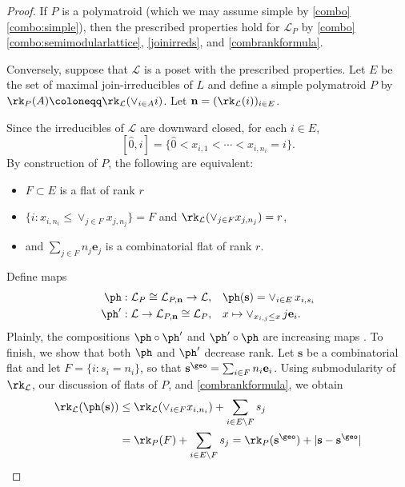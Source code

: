 \begin{proof}
  If $P$ is a polymatroid (which we may assume simple by \cref{combo}\cref{combo:simple}), then the prescribed properties hold for $\mathcal L_P$ by \cref{combo}\cref{combo:semimodularlattice}, \cref{joinirreds}, and \cref{combrankformula}.

  Conversely, suppose that $\mathcal L$ is a poset with the prescribed properties.
  Let $E$ be the set of maximal join-irreducibles of $L$ and define a simple polymatroid $P$ by $\rk_P(A) \coloneqq \rk_{\mathcal L}(\vee_{i \in A} i)$.
  Let $\mathbf n = (\rk_{\mathcal L}(i))_{i \in E}$.

  Since the irreducibles of $\mathcal L$ are downward closed, for each $i \in E$,
  \[
  [\hat 0, i]  = \{\hat 0 < x_{i,1} < \cdots < x_{i, n_i} = i\}.
  \]
  By construction of $P$, the following are equivalent:
  \begin{itemize}
  \item $F \subset E$ is a flat of rank $r$
  \item  $\{i : x_{i,n_i} \leq \vee_{j \in F} x_{j, n_j}\} = F$ and $\rk_{\mathcal L}(\vee_{j \in F}  x_{j, n_j}) = r$,
  \item and $\sum_{j \in F} n_j \mathbf e_j$ is a combinatorial flat of rank $r$.
  \end{itemize}
  Define maps
  \begin{align*}
    \ph: \mathcal L_P \cong \mathcal L_{P, \mathbf n} \to \mathcal L,& \quad \ph(\mathbf s) = \vee_{i \in E}\, x_{i, s_i} \\
    \ph': \mathcal L \to \mathcal L_{P, \mathbf n} \cong \mathcal L_P, &\quad x \mapsto \vee_{x_{i,j} \leq x}\, j \mathbf e_i.
  \end{align*}
  Plainly, the compositions $\ph \circ \ph'$ and $\ph' \circ \ph$ are increasing maps .
  To finish, we show that both $\ph$ and $\ph'$ decrease rank.
  Let $\mathbf s$ be a combinatorial flat and let $F = \{i : s_i = n_i\}$, so that $\mathbf s^\geo = \sum_{i \in F} n_i \mathbf e_i$.
  Using submodularity of $\rk_{\mathcal L}$, our discussion of flats of $P$, and \cref{combrankformula}, we obtain
  \begin{align*}
    \rk_{\mathcal L}(\ph(\mathbf s))
    &\leq \rk_{\mathcal L}(\vee_{i \in F} x_{i, n_i}) + \sum_{i \in E \setminus F} s_j\\ 
    &= \rk_P(F) + \sum_{i \in E \setminus F} s_j
    = \rk_P(\mathbf s^\geo) + |\mathbf s - \mathbf s^\geo|

\end{align*}
\end{proof}
